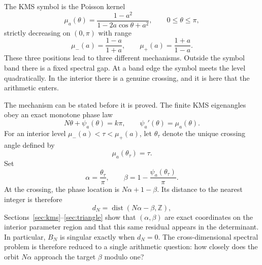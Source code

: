 \documentclass[11pt,reqno]{amsart}
\theoremstyle{plain}
\theoremstyle{definition}
\begin{document}
The KMS symbol is the Poisson kernel
\begin{equation}\label{eq:symbol}
\mu_a(\theta)=\frac{1-a^2}{1-2a\cos\theta+a^2},
\qquad 0\le\theta\le\pi,
\end{equation}
strictly decreasing on $(0,\pi)$ with range
\begin{equation}\label{eq:band}
\mu_-(a)=\frac{1-a}{1+a},
\qquad
\mu_+(a)=\frac{1+a}{1-a}.
\end{equation}
These three positions lead to three different mechanisms.  Outside the symbol band
there is a fixed spectral gap.  At a band edge the symbol meets the level
quadratically.  In the interior there is a genuine crossing, and it is here that the
arithmetic enters.

The mechanism can be stated before it is proved.  The finite KMS eigenangles obey
an exact monotone phase law
\[
N\theta+\psi_a(\theta)=k\pi,
\qquad
\psi_a'(\theta)=\mu_a(\theta).
\]
For an interior level $\mu_-(a)<\tau<\mu_+(a)$, let $\theta_\tau$ denote the
unique crossing angle defined by
\begin{equation}\label{eq:crossing}
\mu_a(\theta_\tau)=\tau.
\end{equation}
Set
\begin{equation}\label{eq:alphabeta-intro}
\alpha=\frac{\theta_\tau}{\pi},
\qquad
\beta=1-\frac{\psi_a(\theta_\tau)}{\pi}.
\end{equation}
At the crossing, the phase location is $N\alpha+1-\beta$.  Its distance to the
nearest integer is therefore
\begin{equation}\label{eq:dndef}
d_N=\operatorname{dist}(N\alpha-\beta,\mathbb Z),
\end{equation}
Sections~\ref{sec:kms}--\ref{sec:triangle} show that $(\alpha,\beta)$ are exact
coordinates on the interior parameter region and that this same residual appears in
the determinant.  In particular, $B_N$ is singular exactly when $d_N=0$.  The
cross-dimensional spectral problem is therefore reduced to a single arithmetic
question: how closely does the orbit $N\alpha$ approach the target $\beta$ modulo
one?
\end{document}
